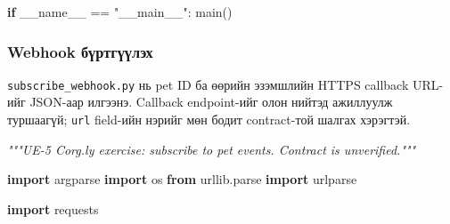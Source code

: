 \documentclass[
  mongolian,
]{article}
\newenvironment{Shaded}{}{}
\newcommand{\CommentTok}[1]{\textcolor[rgb]{0.38,0.63,0.69}{\textit{#1}}}
\newcommand{\ControlFlowTok}[1]{\textcolor[rgb]{0.00,0.44,0.13}{\textbf{#1}}}
\newcommand{\ImportTok}[1]{\textcolor[rgb]{0.00,0.50,0.00}{\textbf{#1}}}
\newcommand{\NormalTok}[1]{#1}
\newcommand{\OperatorTok}[1]{\textcolor[rgb]{0.40,0.40,0.40}{#1}}
\newcommand{\StringTok}[1]{\textcolor[rgb]{0.25,0.44,0.63}{#1}}
\newcommand{\VariableTok}[1]{\textcolor[rgb]{0.10,0.09,0.49}{#1}}
\begin{document}
\begin{Shaded}
\begin{Highlighting}[]
\ControlFlowTok{if} \VariableTok{\_\_name\_\_} \OperatorTok{==} \StringTok{"\_\_main\_\_"}\NormalTok{:}
\NormalTok{    main()}
\end{Highlighting}
\end{Shaded}

\subsubsection{Webhook
бүртгүүлэх}\label{webhook-ux431ux4afux440ux442ux433ux4afux4afux43bux44dux445}

\texttt{subscribe\_webhook.py} нь pet ID ба өөрийн эзэмшлийн HTTPS
callback URL-ийг JSON-аар илгээнэ. Callback endpoint-ийг олон нийтэд
ажиллуулж туршаагүй; \texttt{url} field-ийн нэрийг мөн бодит
contract-той шалгах хэрэгтэй.

\begin{Shaded}
\begin{Highlighting}[]
\CommentTok{"""UE{-}5 Corg.ly exercise: subscribe to pet events. Contract is unverified."""}

\ImportTok{import}\NormalTok{ argparse}
\ImportTok{import}\NormalTok{ os}
\ImportTok{from}\NormalTok{ urllib.parse }\ImportTok{import}\NormalTok{ urlparse}

\ImportTok{import}\NormalTok{ requests}



\end{Highlighting}
\end{Shaded}
\end{document}

